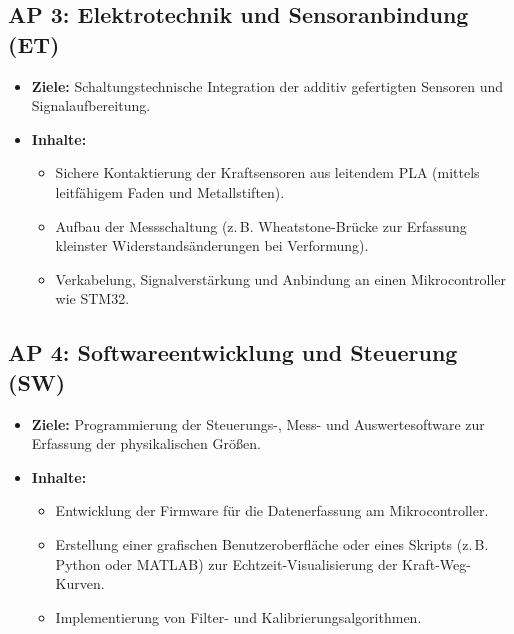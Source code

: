 \documentclass[11pt, a4paper]{article}
\begin{document}
\subsection*{AP 3: Elektrotechnik und Sensoranbindung (ET)}
\begin{itemize}[leftmargin=*, label=$\bullet$]
    \item \textbf{Ziele:} Schaltungstechnische Integration der additiv gefertigten Sensoren und Signalaufbereitung.
    \item \textbf{Inhalte:}
    \begin{itemize}[leftmargin=*]
        \item Sichere Kontaktierung der Kraftsensoren aus leitendem PLA (mittels leitfähigem Faden und Metallstiften).
        \item Aufbau der Messschaltung (z.\,B. Wheatstone-Brücke zur Erfassung kleinster Widerstandsänderungen bei Verformung).
        \item Verkabelung, Signalverstärkung und Anbindung an einen Mikrocontroller wie STM32.
    \end{itemize}
\end{itemize}

\subsection*{AP 4: Softwareentwicklung und Steuerung (SW)}
\begin{itemize}[leftmargin=*, label=$\bullet$]
    \item \textbf{Ziele:} Programmierung der Steuerungs-, Mess- und Auswertesoftware zur Erfassung der physikalischen Größen.
    \item \textbf{Inhalte:}
    \begin{itemize}[leftmargin=*]
        \item Entwicklung der Firmware für die Datenerfassung am Mikrocontroller.
        \item Erstellung einer grafischen Benutzeroberfläche oder eines Skripts (z.\,B. Python oder MATLAB) zur Echtzeit-Visualisierung der Kraft-Weg-Kurven.
        \item Implementierung von Filter- und Kalibrierungsalgorithmen.
    \end{itemize}
\end{itemize}
\end{document}
